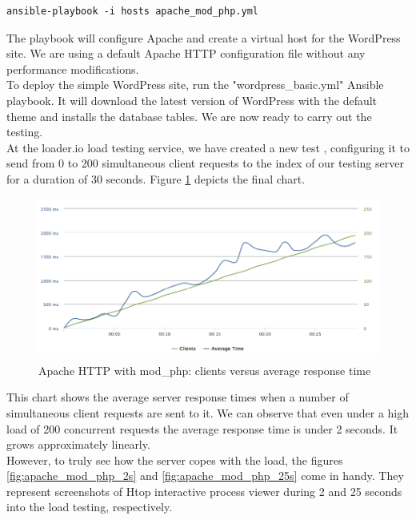\begin{lstlisting}
ansible-playbook -i hosts apache_mod_php.yml
\end{lstlisting}

The playbook will configure Apache and create a virtual host for the WordPress site. We are using a default Apache HTTP configuration file without any performance modifications. \cite{WP_Ansible:apache.conf}\\

To deploy the simple WordPress site, run the "wordpress\_basic.yml" Ansible playbook. It will download the latest version of WordPress with the default theme and installs the database tables. We are now ready to carry out the testing. \\

At the loader.io load testing service, we have created a new test \cite{Loader.io:apache_mod_php}, configuring it to send from 0 to 200 simultaneous client requests to the index of our testing server for a duration of 30 seconds. Figure \ref{fig:apache_mod_php} depicts the final chart.


\begin{figure}[H]
\begin{center}
\includegraphics[scale=0.5]{figures/Apache_mod_php.png}
\caption{Apache HTTP with mod\_php: clients versus average response time}
\label{fig:apache_mod_php}
\end{center}
\end{figure}

This chart shows the average server response times when a number of simultaneous client requests are sent to it. We can observe that even under a high load of 200 concurrent requests the average response time is under 2 seconds. It grows approximately linearly. \\

However, to truly see how the server copes with the load, the figures \ref{fig:apache_mod_php_2s} and \ref{fig:apache_mod_php_25s} come in handy. They represent screenshots of Htop interactive process viewer \cite{Htop:main_site} during 2 and 25 seconds into the load testing, respectively.

